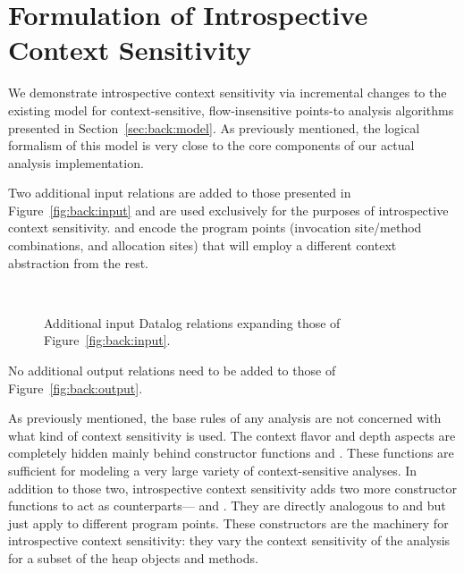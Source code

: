\section{Formulation of Introspective Context Sensitivity}
\label{sec:introspect:model}

We demonstrate introspective context sensitivity via incremental changes to the existing model for context-sensitive, flow-insensitive points-to analysis algorithms presented in Section~\ref{sec:back:model}. As previously mentioned, the logical formalism of this model is very close to the core components of our actual analysis implementation.

Two additional input relations are added to those presented in Figure~\ref{fig:back:input} and are used exclusively for the purposes of introspective context sensitivity.  and  encode the program points (invocation site/method combinations, and allocation sites) that will employ a different context abstraction from the rest.

\begin{figure}[hb]
\begin{datalog}
 \\ 
\end{datalog}
\caption[]{Additional input Datalog relations expanding those of Figure~\ref{fig:back:input}.}
\label{fig:introspect:input}
\end{figure}

No additional output relations need to be added to those of Figure~\ref{fig:back:output}.

As previously mentioned, the base rules of any analysis are not concerned with what kind of context sensitivity is used. The context flavor and depth aspects are completely hidden mainly behind constructor functions  and . These functions are sufficient for modeling a very large variety of context-sensitive analyses. In addition to those two, introspective context sensitivity adds two more constructor functions to act as counterparts--- and . They are directly analogous to  and  but just apply to different program points. These constructors are the machinery for introspective context sensitivity: they vary the context sensitivity of the analysis for a subset of the heap objects and methods.


